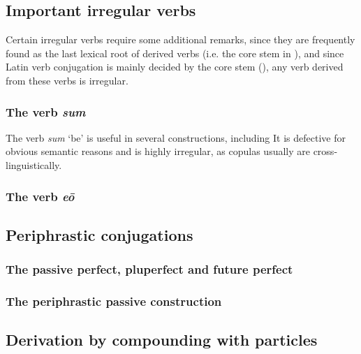 \documentclass{article}
\newcommand*{\corpus}[1]{\emph{#1}}
\begin{document}
\subsection{Important irregular verbs}\label{sec:irregular-verb}

Certain irregular verbs require some additional remarks,
since they are frequently found as the last lexical root of derived verbs 
(i.e. the core stem in ),
and since Latin verb conjugation is mainly decided by the core stem (),
any verb derived from these verbs is irregular.

\subsubsection{The verb \corpus{sum}}\label{sec:sum-verb}

The verb \corpus{sum} `be' is useful in several constructions,
including %
It is defective for obvious semantic reasons
and is highly irregular,
as copulas usually are cross-linguistically.

\subsubsection{The verb \corpus{e\={o}}}

\subsection{Periphrastic conjugations}

\subsubsection{The passive perfect, pluperfect and future perfect}

\subsubsection{The periphrastic passive construction}\label{sec:passive-periphrastic}

\subsection{Derivation by compounding with particles}



\end{document}
